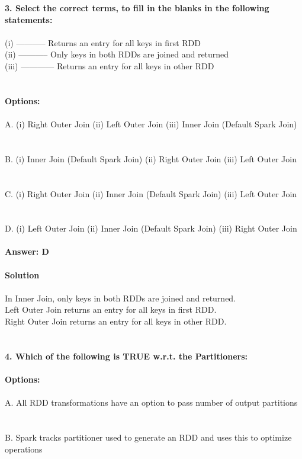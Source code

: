 \documentclass[prl,twocolumn,showpacs,preprintnumbers,superscriptaddress]{revtex4}
\theoremstyle{plain}
\theoremstyle{definition}
\begin{document}
\begin{widetext}
\noindent\textbf{3. Select the correct terms, to fill in the blanks in the following statements:}
\\
\\
(i) ----------- Returns an entry for all keys in first RDD
\\
(ii) -----------  Only keys in both RDDs are joined and returned
\\
(iii) ------------  Returns an entry for all keys in other RDD
\\
\\
\\
\textbf{Options:}
\\
\\
\noindent A. (i) Right Outer Join (ii) Left Outer Join (iii) Inner Join (Default Spark Join)
\\
\\
\\
B. (i) Inner Join (Default Spark Join) (ii) Right Outer Join (iii) Left Outer Join
\\
\\
\\
C. (i) Right Outer Join (ii) Inner Join (Default Spark Join) (iii) Left Outer Join
\\
\\
\\
D. (i) Left Outer Join (ii) Inner Join (Default Spark Join) (iii) Right Outer Join
\\
\\
\textbf{Answer: D}
\\
\\
\textbf{Solution}
\\
\\
In Inner Join, only keys in both RDDs are joined and returned.
\\
Left Outer Join returns an entry for all keys in first RDD.
\\
Right Outer Join returns an entry for all keys in other RDD.
\\
\\
\\
\noindent\textbf{4. Which of the following is TRUE w.r.t. the Partitioners:}
\\
\\
\textbf{Options:}
\\
\\
\noindent A. All RDD transformations have an option to pass number of output partitions
\\
\\
\\
B. Spark tracks partitioner used to generate an RDD and uses this to optimize operations

\end{widetext}
\end{document}
